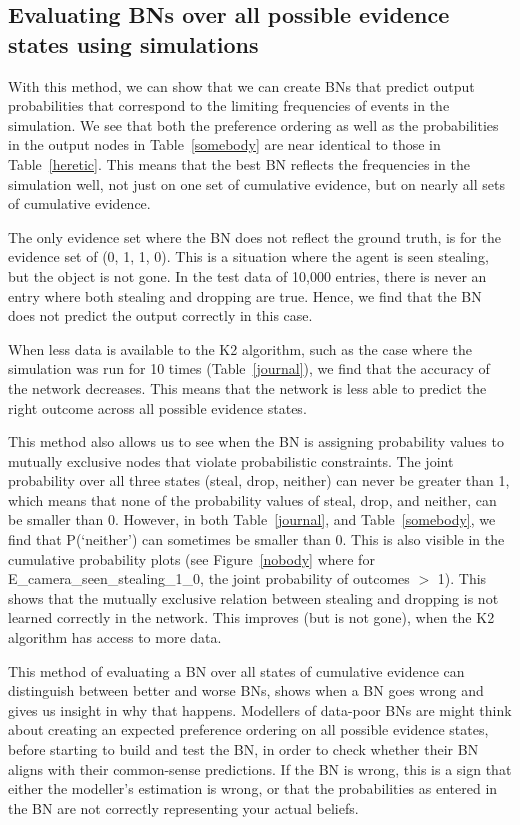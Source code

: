 \documentclass[12pt]{article}
\begin{document}
\subsection{Evaluating BNs over all possible evidence states using simulations}
With this method, we can show that we can create BNs that predict output probabilities that correspond to the limiting frequencies of events in the simulation. We see that both the preference ordering as well as the probabilities in the output nodes in Table~\ref{somebody} are near identical to those in Table~\ref{heretic}. This means that the best BN reflects the frequencies in the simulation well, not just on one set of cumulative evidence, but on nearly all sets of cumulative evidence. 

The only evidence set where the BN does not reflect the ground truth, is for the evidence set of (0, 1, 1, 0). This is a situation where the agent is seen stealing, but the object is not gone. In the test data of 10,000 entries, there is never an entry where both stealing and dropping are true. Hence, we find that the BN does not predict the output correctly in this case. 

When less data is available to the K2 algorithm, such as the case where the simulation was run for 10 times (Table~\ref{journal}), we find that the accuracy of the network decreases. This means that the network is less able to predict the right outcome across all possible evidence states.

This method also allows us to see when the BN is assigning probability values to mutually exclusive nodes that violate probabilistic constraints. The joint probability over all three states (steal, drop, neither) can never be greater than 1, which means that none of the probability values of steal, drop, and neither, can be smaller than 0. However, in both Table~\ref{journal}, and Table~\ref{somebody}, we find that P(`neither') can sometimes be smaller than 0. This is also visible in the cumulative probability plots (see Figure~\ref{nobody} where for E\_camera\_seen\_stealing\_1\_0, the joint probability of outcomes $>$ 1). This shows that the mutually exclusive relation between stealing and dropping is not learned correctly in the network. This improves (but is not gone), when the K2 algorithm has access to more data.


This method of evaluating a BN over all states of cumulative evidence can distinguish between better and worse BNs, shows when a BN goes wrong and gives us insight in why that happens. Modellers of data-poor BNs are might think about creating an expected preference ordering on all possible evidence states, before starting to build and test the BN, in order to check whether their BN aligns with their common-sense predictions. If the BN is wrong, this is a sign that either the modeller's estimation is wrong, or that the probabilities as entered in the BN are not correctly representing your actual beliefs.
\end{document}
